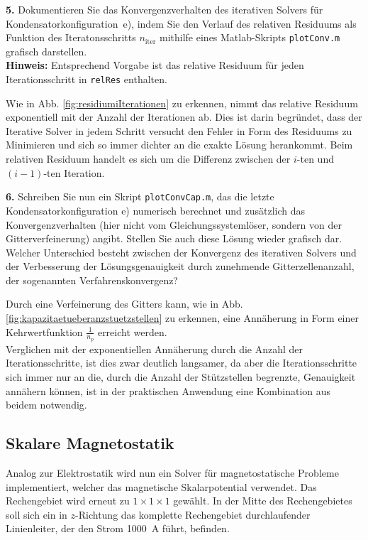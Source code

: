 \documentclass[Protokollheft.tex]{subfiles}
\begin{document}
\begin{framed}
	\noindent \textbf{5.}   Dokumentieren Sie das Konvergenzverhalten des iterativen Solvers für Kondensatorkonfiguration~e), indem Sie
den Verlauf des relativen Residuums als Funktion des Iteratonsschritts $n_\text{iter}$ mithilfe eines Matlab-Skripts \lstinline{plotConv.m} grafisch darstellen.\\
{\textbf{Hinweis:}} Entsprechend Vorgabe ist das relative Residuum für jeden Iterationsschritt in \lstinline{relRes} enthalten.\label{exer:plotCapConvSolver}
\end{framed}
\noindent
Wie in Abb. \ref{fig:residiumiIterationen} zu erkennen, nimmt das relative Residuum exponentiell mit der Anzahl der Iterationen ab. Dies ist darin begründet, dass der Iterative Solver in jedem Schritt versucht den Fehler in Form des Residuums zu Minimieren und sich so immer dichter an die exakte Lösung herankommt. 
Beim relativen Residuum handelt es sich um die Differenz zwischen der $i$-ten und $(i-1)$-ten Iteration. 





\begin{framed}
	\noindent \textbf{6.} Schreiben Sie nun ein Skript \lstinline{plotConvCap.m}, das die letzte Kondensatorkonfiguration e) numerisch berechnet
und zusätzlich das Konvergenzverhalten (hier nicht vom Gleichungssystemlöser, sondern von der Gitterverfeinerung)
angibt. Stellen Sie auch diese Lösung wieder grafisch dar.\\
Welcher Unterschied besteht zwischen der Konvergenz des iterativen Solvers und der Verbesserung der Lösungsgenauigkeit durch zunehmende Gitterzellenanzahl, der sogenannten Verfahrenskonvergenz?\label{exer:plotCapConvMesh}
\end{framed}
\noindent
Durch eine Verfeinerung des Gitters kann, wie in Abb. \ref{fig:kapazitaetueberanzstuetzstellen} zu erkennen, eine Annäherung in Form einer Kehrwertfunktion $\frac{1}{n_p}$ erreicht werden. \\
Verglichen mit der exponentiellen Annäherung durch die Anzahl der Iterationsschritte, ist dies zwar deutlich langsamer, da aber die Iterationsschritte sich immer nur an die, durch die Anzahl der Stützstellen begrenzte, Genauigkeit annähern können, ist in der praktischen Anwendung eine Kombination aus beidem notwendig. 

%
{\subsection{Skalare Magnetostatik}}
Analog zur Elektrostatik wird nun ein Solver für magnetostatische Probleme implementiert, welcher das magnetische Skalarpotential verwendet. Das Rechengebiet wird erneut zu $1\times 1\times 1$ gewählt. In der Mitte des Rechengebietes soll sich ein in $z$-Richtung das komplette Rechengebiet durchlaufender Linienleiter, der den Strom \SI{1000}{A} führt, befinden.
\end{document}
